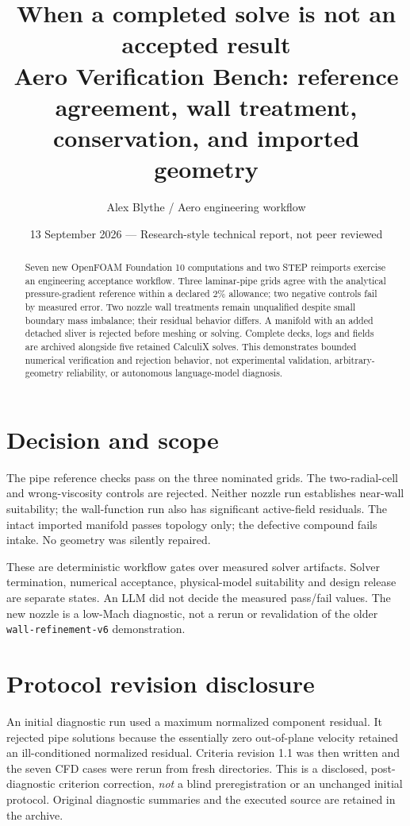 \documentclass[10pt]{article}
\title{When a completed solve is not an accepted result\\\large Aero Verification Bench: reference agreement, wall treatment, conservation, and imported geometry}
\author{Alex Blythe / Aero engineering workflow}\date{13 September 2026 --- Research-style technical report, not peer reviewed}
\begin{document}
\maketitle
\begin{abstract}
Seven new OpenFOAM Foundation 10 computations and two STEP reimports exercise an engineering acceptance workflow. Three laminar-pipe grids agree with the analytical pressure-gradient reference within a declared 2\% allowance; two negative controls fail by measured error. Two nozzle wall treatments remain unqualified despite small boundary mass imbalance; their residual behavior differs. A manifold with an added detached sliver is rejected before meshing or solving. Complete decks, logs and fields are archived alongside five retained CalculiX solves. This demonstrates bounded numerical verification and rejection behavior, not experimental validation, arbitrary-geometry reliability, or autonomous language-model diagnosis.
\end{abstract}
\section{Decision and scope}
The pipe reference checks pass on the three nominated grids. The two-radial-cell and wrong-viscosity controls are rejected. Neither nozzle run establishes near-wall suitability; the wall-function run also has significant active-field residuals. The intact imported manifold passes topology only; the defective compound fails intake. No geometry was silently repaired.

These are deterministic workflow gates over measured solver artifacts. Solver termination, numerical acceptance, physical-model suitability and design release are separate states. An LLM did not decide the measured pass/fail values. The new nozzle is a low-Mach diagnostic, not a rerun or revalidation of the older \texttt{wall-refinement-v6} demonstration.

\section{Protocol revision disclosure}
An initial diagnostic run used a maximum normalized component residual. It rejected pipe solutions because the essentially zero out-of-plane velocity retained an ill-conditioned normalized residual. Criteria revision 1.1 was then written and the seven CFD cases were rerun from fresh directories. This is a disclosed, post-diagnostic criterion correction, \emph{not} a blind preregistration or an unchanged initial protocol. Original diagnostic summaries and the executed source are retained in the archive.
\end{document}
